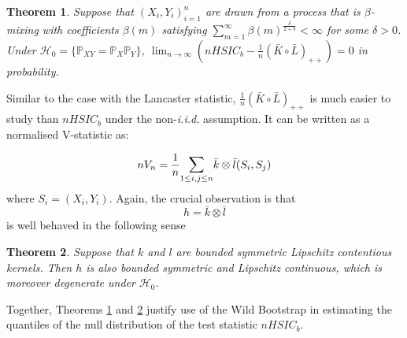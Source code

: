 \documentclass[]{article}
\newtheorem{theorem}{Theorem}
\begin{document}
\begin{theorem}\label{theorem:HSIC-conv-in-prob} Suppose that $(X_i,Y_i)_{i=1}^n$ are drawn from a process that is $\beta$-mixing with coefficients $\beta(m)$ satisfying $\sum_{m=1}^{\infty}\beta(m)^{\frac{\delta}{2+\delta}}<\infty$ for some $\delta>0$. Under $\mathcal{H}_0 = \{ \mathbb{P}_{XY} = \mathbb{P}_X\mathbb{P}_Y\}$, $\lim_{n \to \infty} ( nHSIC_b - \frac{1}{n} (\bar{K}\circ \bar{L})_{++} ) =0 $ in probability.
\end{theorem}
Similar to the case with the Lancaster statistic, $\frac{1}{n} (\bar{K}\circ \bar{L})_{++}$ is much easier to study than $nHSIC_b$ under the non-\emph{i.i.d.} assumption. It can be written as a normalised V-statistic as:
 
\[ 
nV_n = \frac{1}{n} \mathlarger{\sum}_{1\leq i,j \leq n} \bar{k} \otimes \bar{l}(S_i,S_j)
\]
where  $S_i = (X_i,Y_i)$. Again, the crucial observation is that
\[
 h = \bar{k} \otimes \bar{l}
\]
is well behaved in the following sense 
\begin{theorem}\label{theorem:HSIC-degenerate-kernel}
Suppose that $k$ and $l$ are bounded symmetric Lipschitz contentious kernels. Then $h$ is also bounded symmetric and Lipschitz continuous, which is moreover degenerate under $\mathcal{H}_0$.
\end{theorem}

Together, Theorems \ref{theorem:HSIC-conv-in-prob} and \ref{theorem:HSIC-degenerate-kernel} justify use of the Wild Bootstrap in estimating the quantiles of the null distribution of the test statistic $nHSIC_b$.
\end{document}
